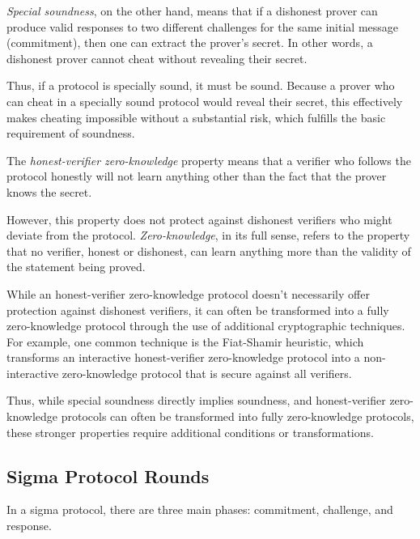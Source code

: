 \textit{Special soundness}, on the other hand, means that if a dishonest prover can produce valid responses to two different challenges for the same initial message (commitment), then one can extract the prover's secret. In other words, a dishonest prover cannot cheat without revealing their secret. 

Thus, if a protocol is specially sound, it must be sound. Because a prover who can cheat in a specially sound protocol would reveal their secret, this effectively makes cheating impossible without a substantial risk, which fulfills the basic requirement of soundness.

The \textit{honest-verifier zero-knowledge} property means that a verifier who follows the protocol honestly will not learn anything other than the fact that the prover knows the secret. 

However, this property does not protect against dishonest verifiers who might deviate from the protocol. \textit{Zero-knowledge}, in its full sense, refers to the property that no verifier, honest or dishonest, can learn anything more than the validity of the statement being proved.

While an honest-verifier zero-knowledge protocol doesn't necessarily offer protection against dishonest verifiers, it can often be transformed into a fully zero-knowledge protocol through the use of additional cryptographic techniques. For example, one common technique is the Fiat-Shamir heuristic, which transforms an interactive honest-verifier zero-knowledge protocol into a non-interactive zero-knowledge protocol that is secure against all verifiers.

Thus, while special soundness directly implies soundness, and honest-verifier zero-knowledge protocols can often be transformed into fully zero-knowledge protocols, these stronger properties require additional conditions or transformations.

\subsection{Sigma Protocol Rounds}
In a sigma protocol, there are three main phases: commitment, challenge, and response.

